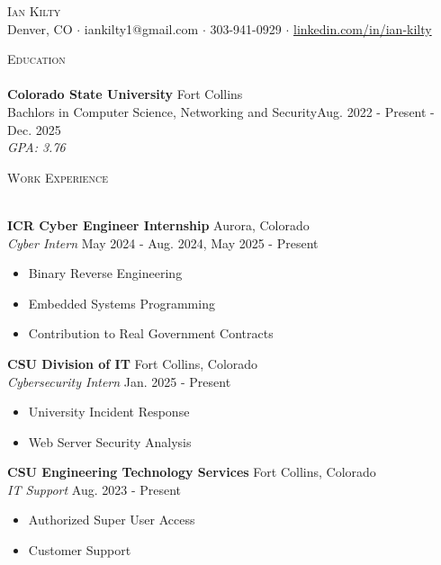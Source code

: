 \documentclass[a4paper]{article}
\newcommand{\lineunder} {
    \vspace*{-8pt} \\
    \hspace*{-18pt} \hrulefill \\
}
\newcommand{\header} [1] {
    {\hspace*{-18pt}\vspace*{6pt} \textsc{#1}}
    \vspace*{-6pt} \lineunder
}
\begin{document}
\vspace*{-40pt}

    

\vspace*{-10pt}
\begin{center}
	{\Huge \scshape {Ian Kilty}}\\
	Denver, CO $\cdot$ iankilty1@gmail.com $\cdot$ 303-941-0929 $\cdot$ \href{https://www.linkedin.com/in/ian-kilty}{linkedin.com/in/ian-kilty}\\
\end{center}

\header{Education}
\textbf{Colorado State University}
\hfill Fort Collins\\

Bachlors in Computer Science, Networking and Security\hfill Aug. 2022 - Present - Dec. 2025\\

\textit{GPA: 3.76}
\vspace{2mm}

\header{Work Experience}
\vspace{1mm}

\textbf{ICR Cyber Engineer Internship} \hfill Aurora, Colorado\\
\textit{Cyber Intern} \hfill May 2024 - Aug. 2024, May 2025 - Present\textbf{}\\
\vspace{-1mm}
\begin{itemize} \itemsep 1pt
    \item Binary Reverse Engineering
	\item Embedded Systems Programming
	\item Contribution to Real Government Contracts
\end{itemize}

\textbf{CSU Division of IT} \hfill Fort Collins, Colorado\\
\textit{Cybersecurity Intern} \hfill Jan. 2025 - Present\\
\vspace{-1mm}
\begin{itemize} \itemsep 1pt
	\item University Incident Response
	\item Web Server Security Analysis
\end{itemize}

\textbf{CSU Engineering Technology Services} \hfill Fort Collins, Colorado\\
\textit{IT Support} \hfill Aug. 2023 - Present\\
\vspace{-1mm}
\begin{itemize} \itemsep 1pt
	\item Authorized Super User Access
    \item Customer Support
\end{itemize}
\end{document}
